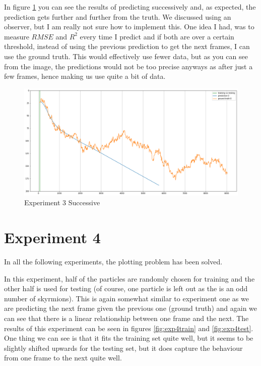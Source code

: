 \documentclass[a4paper]{article}
\begin{document}
In figure \ref{fig:exp3succ} you can see the results of predicting successively and, as expected, the prediction gets further and further from the truth. We discussed using an observer, but I am really not sure how to implement this. One idea I had, was to measure $RMSE$ and $R^2$ every time I predict and if both are over a certain threshold, instead of using the previous prediction to get the next frames, I can use the ground truth. This would effectively use fewer data, but as you can see from the image, the predictions would not be too precise anyways as after just a few frames, hence making us use quite a bit of data.

\begin{figure}[h]
  \centering
  \includegraphics[width=\textwidth]{exp 3 successice}
  \caption{Experiment 3 Successive}
  \label{fig:exp3succ}
\end{figure}

\section{Experiment 4}
In all the following experiments, the plotting problem has been solved.

In this experiment, half of the particles are randomly chosen for training and the other half is used for testing (of course, one particle is left out as the is an odd number of skyrmions). This is again somewhat similar to experiment one as we are predicting the next frame given the previous one (ground truth) and again we can see that there is a linear relationship between one frame and the next. The results of this experiment can be seen in figures \ref{fig:exp4train} and \ref{fig:exp4test}. One thing we can see is that it fits the training set quite well, but it seems to be slightly shifted upwards for the testing set, but it does capture the behaviour from one frame to the next quite well.
\end{document}
